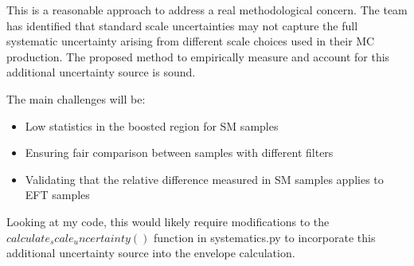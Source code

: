 \documentclass{article}
\begin{document}
This is a reasonable approach to address a real methodological concern. The team has identified that standard scale uncertainties may not capture the full systematic uncertainty arising from different scale choices used in their MC production. The proposed method to empirically measure and account for this additional uncertainty source is sound.

The main challenges will be:

\begin{itemize}
    \item Low statistics in the boosted region for SM samples
    \item Ensuring fair comparison between samples with different filters
    \item Validating that the relative difference measured in SM samples applies to EFT samples
\end{itemize}

Looking at my code, this would likely require modifications to the $calculate_scale_uncertainty()$ function in systematics.py to incorporate this additional uncertainty source into the envelope calculation.
\end{document}
